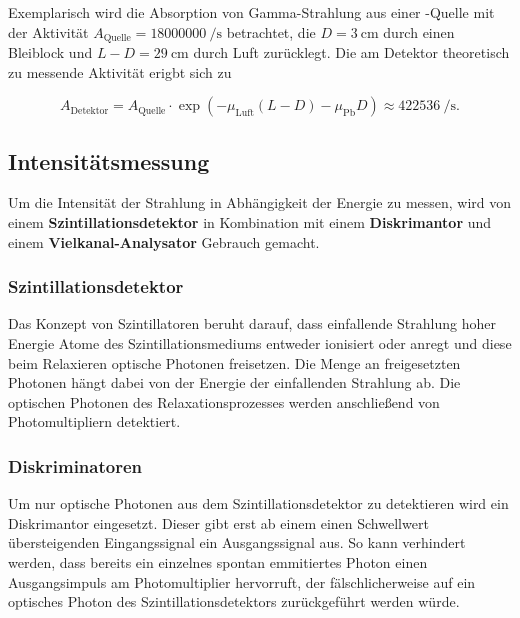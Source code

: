         Exemplarisch wird die Absorption von Gamma-Strahlung aus einer -Quelle mit der Aktivität $A_{\text{Quelle}} = \SI{18000000}{\per\second}$ betrachtet, die $D=\SI{3}{\centi\metre}$ durch einen 
        Bleiblock und $L-D = \SI{29}{\centi\metre}$ durch Luft zurücklegt. Die am Detektor theoretisch zu messende Aktivität erigbt sich zu

        \begin{equation*}
          A_{\text{Detektor}} = A_{\text{Quelle}} \cdot \exp\left(-\mu_{\text{Luft}}\left(L-D\right) - \mu_{\text{Pb}}D\right) \approx \SI{422536}{\per\second}.
        \end{equation*}
    
        \FloatBarrier

      \newpage
      \subsection{Intensitätsmessung}
        Um die Intensität der Strahlung in Abhängigkeit der Energie zu messen, wird von einem \textbf{Szintillationsdetektor} in Kombination mit einem \textbf{Diskrimantor} und einem 
        \textbf{Vielkanal-Analysator} Gebrauch gemacht.

        \subsubsection*{Szintillationsdetektor}
          Das Konzept von Szintillatoren beruht darauf, dass einfallende Strahlung hoher Energie Atome des Szintillationsmediums entweder ionisiert oder anregt und 
          diese beim Relaxieren optische Photonen freisetzen. Die Menge an freigesetzten Photonen hängt dabei von der Energie der einfallenden Strahlung ab. Die optischen Photonen des Relaxationsprozesses 
          werden anschließend von Photomultipliern detektiert. %

        \subsubsection*{Diskriminatoren}
          Um nur optische Photonen aus dem Szintillationsdetektor zu detektieren wird ein Diskrimantor eingesetzt. Dieser gibt erst ab einem einen Schwellwert übersteigenden Eingangssignal ein Ausgangssignal 
          aus. So kann verhindert werden, dass bereits ein einzelnes spontan emmitiertes Photon einen Ausgangsimpuls am Photomultiplier hervorruft, der fälschlicherweise auf ein optisches Photon des 
          Szintillationsdetektors zurückgeführt werden würde.

